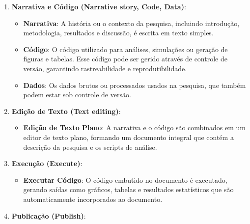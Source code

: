 \documentclass[
  a4paper,
]{article}
\providecommand{\tightlist}{%
  \setlength{\itemsep}{0pt}\setlength{\parskip}{0pt}}\usepackage{longtable,booktabs,array}
\begin{document}
\begin{tcolorbox}[enhanced jigsaw, breakable, opacityback=0, left=2mm, colbacktitle=quarto-callout-note-color!10!white, colframe=quarto-callout-note-color-frame, coltitle=black, title=\textcolor{quarto-callout-note-color}{\faInfo}\hspace{0.5em}{O que o ChatGPT 4o nos diz sobre a Figura~\ref{fig-all-workflow}?}, titlerule=0mm, leftrule=.75mm, arc=.35mm, colback=white, bottomtitle=1mm, toptitle=1mm, toprule=.15mm, bottomrule=.15mm, rightrule=.15mm, opacitybacktitle=0.6]

\begin{enumerate}
\def\labelenumi{\arabic{enumi}.}
\tightlist
\item
  \textbf{Narrativa e Código (Narrative story, Code, Data)}:

  \begin{itemize}
  \tightlist
  \item
    \textbf{Narrativa}: A história ou o contexto da pesquisa, incluindo
    introdução, metodologia, resultados e discussão, é escrita em texto
    simples.
  \item
    \textbf{Código}: O código utilizado para análises, simulações ou
    geração de figuras e tabelas. Esse código pode ser gerido através de
    controle de versão, garantindo rastreabilidade e reprodutibilidade.
  \item
    \textbf{Dados}: Os dados brutos ou processados usados na pesquisa,
    que também podem estar sob controle de versão.
  \end{itemize}
\item
  \textbf{Edição de Texto (Text editing)}:

  \begin{itemize}
  \tightlist
  \item
    \textbf{Edição de Texto Plano}: A narrativa e o código são
    combinados em um editor de texto plano, formando um documento
    integral que contém a descrição da pesquisa e os scripts de análise.
  \end{itemize}
\item
  \textbf{Execução (Execute)}:

  \begin{itemize}
  \tightlist
  \item
    \textbf{Executar Código}: O código embutido no documento é
    executado, gerando saídas como gráficos, tabelas e resultados
    estatísticos que são automaticamente incorporados ao documento.
  \end{itemize}
\item
  \textbf{Publicação (Publish)}:


\end{enumerate}
\end{tcolorbox}
\end{document}
